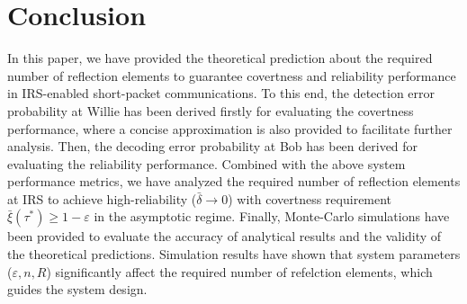 \documentclass[conference]{IEEEtran}
\begin{document}
\section{Conclusion}
In this paper, we have provided the theoretical prediction about the required number of reflection elements to guarantee covertness and reliability performance in IRS-enabled short-packet communications. To this end,
the detection error probability at Willie has been derived firstly for evaluating the covertness performance, where a concise approximation is also provided to facilitate further analysis. Then, the decoding error probability at Bob has been derived for evaluating the reliability performance. Combined with the above system performance metrics, we have analyzed the required number of reflection elements at IRS to achieve high-reliability ($\bar\delta \to 0$) with covertness requirement $\bar\xi (\tau^*) \geq 1-\varepsilon$ in the asymptotic regime. Finally, Monte-Carlo simulations have been provided to evaluate the accuracy of analytical results and the validity of the theoretical predictions. Simulation results have shown that system parameters ($\varepsilon,n,R$) significantly affect the required number of refelction elements, which guides the system design.


\appendices
\end{document}
